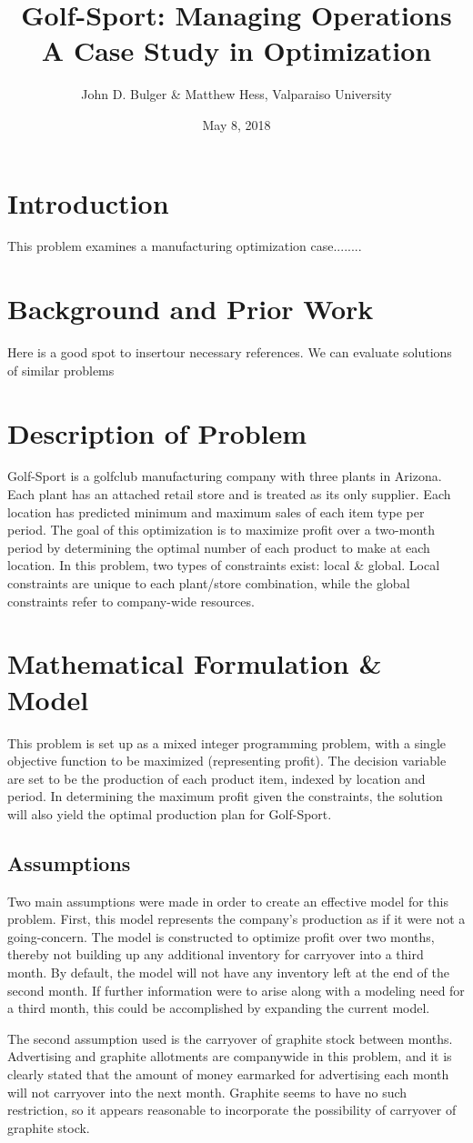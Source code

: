 \documentclass{article}
\title{Golf-Sport:  Managing Operations \\ A Case Study in Optimization}
\date{May 8, 2018}
\author{John D. Bulger \& Matthew Hess, Valparaiso University}
\begin{document}
	\maketitle
	\newpage
\section{Introduction}
This problem examines a manufacturing optimization case........
\section{Background and Prior Work}
Here is a good spot to insertour necessary references.  We can evaluate solutions of similar problems
\section{Description of Problem}
Golf-Sport is a golfclub manufacturing company with three plants in Arizona.  Each plant has an attached retail store and is treated as its
only supplier.  Each location has predicted minimum and maximum sales of each item type per period.  The goal of this optimization is to maximize profit over a two-month period by determining the optimal number of each product to make
at each location.  In this problem, two types of constraints exist:  local \& global.  Local constraints are unique to each plant/store
 combination, while the global constraints refer to company-wide resources.
\section{Mathematical Formulation \& Model}
This problem is set up as a mixed integer programming problem, with a single objective function to be maximized (representing profit).  
The decision variable are set to be the production of each product item, indexed by location and period.  In determining the maximum profit given the constraints, 
the solution will also yield the optimal production plan for Golf-Sport.
\subsection{Assumptions}
Two main assumptions were made in order to create an effective model for this problem.  First, this model represents the company's production as if it were not a 
going-concern.  The model is constructed to optimize profit over two months, thereby not building up any additional inventory for carryover into 
a third month.  By default, the model will not have any inventory left at the end of the second month.  If further information were to arise along with 
a modeling need for a third month, this could be accomplished by expanding the current model. \par
The second assumption used is the carryover of graphite stock between months.  Advertising and graphite allotments are companywide in this problem, and 
it is clearly stated that the amount of money earmarked for advertising each month will not carryover into the next month.  Graphite seems to have no such restriction, so 
it appears reasonable to incorporate the possibility of carryover of graphite stock.
\end{document}
